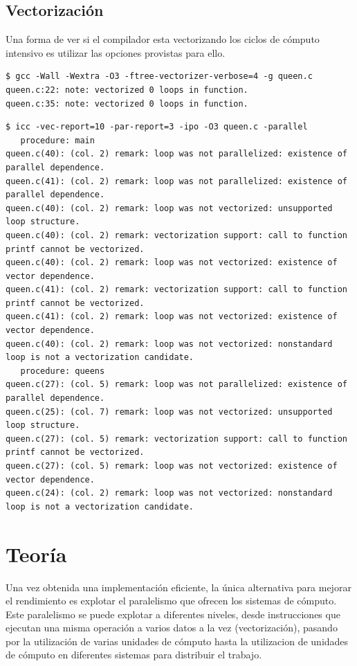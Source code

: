 \documentclass[a4paper]{report}
\begin{document}
\subsection{Vectorizaci\'on}

Una forma de ver si el compilador esta vectorizando los ciclos de c\'omputo
intensivo es utilizar las opciones provistas para ello.

{\small
\begin{verbatim}
$ gcc -Wall -Wextra -O3 -ftree-vectorizer-verbose=4 -g queen.c
queen.c:22: note: vectorized 0 loops in function.
queen.c:35: note: vectorized 0 loops in function.
\end{verbatim}
}

{\small
\begin{verbatim}
$ icc -vec-report=10 -par-report=3 -ipo -O3 queen.c -parallel
   procedure: main
queen.c(40): (col. 2) remark: loop was not parallelized: existence of parallel dependence.
queen.c(41): (col. 2) remark: loop was not parallelized: existence of parallel dependence.
queen.c(40): (col. 2) remark: loop was not vectorized: unsupported loop structure.
queen.c(40): (col. 2) remark: vectorization support: call to function printf cannot be vectorized.
queen.c(40): (col. 2) remark: loop was not vectorized: existence of vector dependence.
queen.c(41): (col. 2) remark: vectorization support: call to function printf cannot be vectorized.
queen.c(41): (col. 2) remark: loop was not vectorized: existence of vector dependence.
queen.c(40): (col. 2) remark: loop was not vectorized: nonstandard loop is not a vectorization candidate.
   procedure: queens
queen.c(27): (col. 5) remark: loop was not parallelized: existence of parallel dependence.
queen.c(25): (col. 7) remark: loop was not vectorized: unsupported loop structure.
queen.c(27): (col. 5) remark: vectorization support: call to function printf cannot be vectorized.
queen.c(27): (col. 5) remark: loop was not vectorized: existence of vector dependence.
queen.c(24): (col. 2) remark: loop was not vectorized: nonstandard loop is not a vectorization candidate.
\end{verbatim}
}

\section{Teor\'ia}

Una vez obtenida una implementaci\'on eficiente, la \'unica alternativa para mejorar el rendimiento es explotar el paralelismo que
ofrecen los sistemas de c\'omputo. Este paralelismo se puede explotar a diferentes niveles, desde instrucciones que ejecutan una misma operaci\'on a varios
datos a la vez (vectorizaci\'on), pasando por la utilizaci\'on de varias unidades de c\'omputo hasta la utilizacion de unidades de c\'omputo en diferentes sistemas para distribuir el trabajo.
\end{document}
